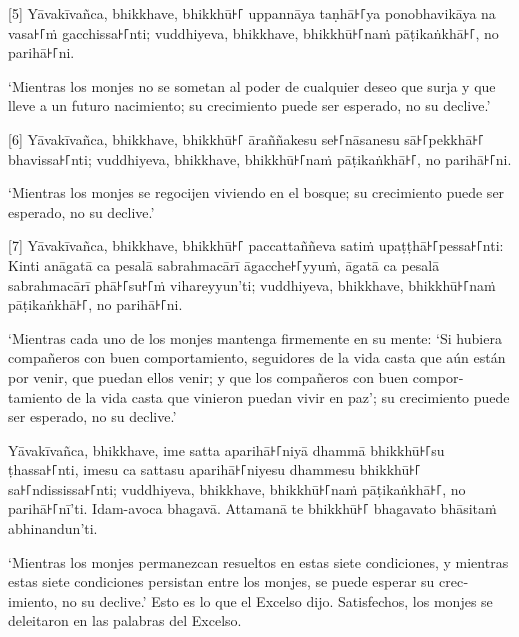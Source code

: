 \enlargethispage{2\baselineskip}

[5] Yāvakīvañca, bhikkhave, bhikkhū꜔꜒ uppannāya taṇhā꜔꜒ya ponobhavikāya na vasa꜔꜒ṁ
gacchissa꜔꜒nti; vuddhiyeva, bhikkhave, bhikkhū꜔꜒naṁ pāṭikaṅkhā꜔꜒, no parihā꜔꜒ni.

\begin{english}
  ‘Mientras los monjes no se sometan al poder de cualquier deseo que surja y
  que lleve a un futuro nacimiento; su crecimiento puede ser
  esperado, no su declive.’
\end{english}

[6] Yāvakīvañca, bhikkhave, bhikkhū꜔꜒ āraññakesu se꜔꜒nāsanesu sā꜔꜒pekkhā꜔꜒ bhavissa꜔꜒nti;
vuddhiyeva, bhikkhave, bhikkhū꜔꜒naṁ pāṭikaṅkhā꜔꜒, no parihā꜔꜒ni.

\begin{english}
  ‘Mientras los monjes se regocijen viviendo en el bosque;
  su crecimiento puede ser esperado, no su declive.’
\end{english}

[7] Yāvakīvañca, bhikkhave, bhikkhū꜔꜒ paccattaññeva satiṁ upaṭṭhā꜔꜒pessa꜔꜒nti: Kinti
anāgatā ca pesalā sabrahmacārī āgacche꜔꜒yyuṁ, āgatā ca pesalā sabrahmacārī phā꜔꜒su꜔꜒ṁ
vihareyyun'ti; vuddhiyeva, bhikkhave, bhikkhū꜔꜒naṁ pāṭikaṅkhā꜔꜒, no parihā꜔꜒ni.

\begin{english}
  ‘Mientras cada uno de los monjes mantenga firmemente en su mente: ‘Si hubiera
  compañeros con buen comportamiento, seguidores de la vida casta que aún están por
  venir, que puedan ellos venir; y que los compañeros con buen comportamiento de la vida casta
  que vinieron puedan vivir en paz’; su crecimiento puede ser esperado, no su declive.’
\end{english}

Yāvakīvañca, bhikkhave, ime satta aparihā꜔꜒niyā dhammā bhikkhū꜔꜒su ṭhassa꜔꜒nti, imesu
ca sattasu aparihā꜔꜒niyesu dhammesu bhikkhū꜔꜒ sa꜔꜒ndississa꜔꜒nti; vuddhiyeva, bhikkhave,
bhikkhū꜔꜒naṁ pāṭikaṅkhā꜔꜒, no parihā꜔꜒nī'ti. Idam-avoca bhagavā. Attamanā te bhikkhū꜔꜒
bhagavato bhāsitaṁ abhinandun'ti.

\begin{english}
  ‘Mientras los monjes permanezcan resueltos en estas siete condiciones, y mientras
  estas siete condiciones persistan entre los monjes, se puede esperar su
  crecimiento, no su declive.’ Esto es lo que el Excelso dijo. Satisfechos,
  los monjes se deleitaron en las palabras del Excelso.
\end{english}
